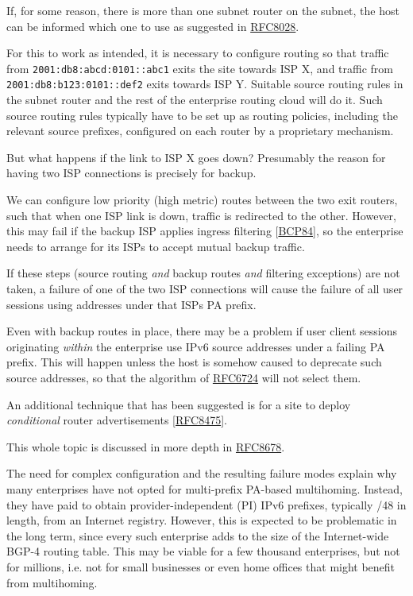 \documentclass[
]{article}
\begin{document}
If, for some reason, there is more than one subnet router on the subnet,
the host can be informed which one to use as suggested in
\href{https://www.rfc-editor.org/info/rfc8028}{RFC8028}.

For this to work as intended, it is necessary to configure routing so
that traffic from \texttt{2001:db8:abcd:0101::abc1} exits the site
towards ISP X, and traffic from \texttt{2001:db8:b123:0101::def2} exits
towards ISP Y. Suitable source routing rules in the subnet router and
the rest of the enterprise routing cloud will do it. Such source routing
rules typically have to be set up as routing policies, including the
relevant source prefixes, configured on each router by a proprietary
mechanism.

But what happens if the link to ISP X goes down? Presumably the reason
for having two ISP connections is precisely for backup.

We can configure low priority (high metric) routes between the two exit
routers, such that when one ISP link is down, traffic is redirected to
the other. However, this may fail if the backup ISP applies ingress
filtering {[}\href{https://www.rfc-editor.org/info/bcp84}{BCP84}{]}, so
the enterprise needs to arrange for its ISPs to accept mutual backup
traffic.

If these steps (source routing \emph{and} backup routes \emph{and}
filtering exceptions) are not taken, a failure of one of the two ISP
connections will cause the failure of all user sessions using addresses
under that ISP\textquotesingle s PA prefix.

Even with backup routes in place, there may be a problem if user client
sessions originating \emph{within} the enterprise use IPv6 source
addresses under a failing PA prefix. This will happen unless the host is
somehow caused to deprecate such source addresses, so that the algorithm
of \href{https://www.rfc-editor.org/info/rfc6724}{RFC6724} will not
select them.

An additional technique that has been suggested is for a site to deploy
\emph{conditional} router advertisements
{[}\href{https://www.rfc-editor.org/info/rfc8475}{RFC8475}{]}.

This whole topic is discussed in more depth in
\href{https://www.rfc-editor.org/info/rfc8678}{RFC8678}.

The need for complex configuration and the resulting failure modes
explain why many enterprises have not opted for multi-prefix PA-based
multihoming. Instead, they have paid to obtain provider-independent (PI)
IPv6 prefixes, typically /48 in length, from an Internet registry.
However, this is expected to be problematic in the long term, since
every such enterprise adds to the size of the Internet-wide BGP-4
routing table. This may be viable for a few thousand enterprises, but
not for millions, i.e. not for small businesses or even home offices
that might benefit from multihoming.
\end{document}
